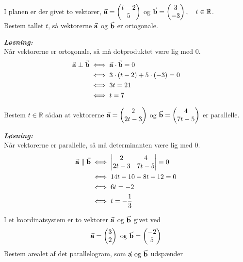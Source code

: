 \documentclass{article}
\newcommand{\sol}{\setlength{\parindent}{0cm}\textbf{\textit{Løsning:}}\setlength{\parindent}{1cm}}
\begin{document}
\begin{question}{}{}
  I planen er der givet to vektorer, $\va{a} =\begin{pmatrix} t-2\\ 5 \end{pmatrix}$ og $\va{b} =\begin{pmatrix} 3\\ -3 \end{pmatrix},\quad t \in \mathbb{R} $. \\
Bestem tallet $t$, så vektorerne $\va{a} $ og $\va{b} $ er ortogonale. 
\end{question}
\sol \\ 
Når vektorerne er ortogonale, så må dotproduktet være lig med 0.
\begin{equation*}
\begin{split}
  \va{a} \perp \va{b} &\iff \va{a} \cdot \va{b} =0\\ 
  &\iff 3 \cdot \left(t-2\right) + 5 \cdot \left(-3\right) =0\\ 
  &\iff 3t=21\\ 
  &\iff t=7
\end{split}
\end{equation*}
\begin{question}{}{}
  Bestem $t \in \mathbb{R}$ sådan at vektorerne $\va{a} = \begin{pmatrix} 2\\ 2t-3 \end{pmatrix} $ og $\va{b} =\begin{pmatrix} 4\\ 7t-5 \end{pmatrix} $ er parallelle. 
\end{question}
\sol \\ 
Når vektorerne er parallelle, så må determinanten være lig med 0.
\begin{equation*}
\begin{split}
  \va{a} \parallel \va{b} &\iff \mdet{2 & 4 \\ 2t-3 & 7t-5} = 0\\ 
  &\iff 14t-10-8t+12=0 \\ 
  &\iff 6t=-2\\ 
  &\iff t=-\frac{1}{3}
\end{split}
\end{equation*}
\begin{question}{}{}
 I et koordinatsystem er to vektorer $\va{a} $ og $\va{b} $ givet ved 
  \[
  \va{a} =\begin{pmatrix} 3\\ 2 \end{pmatrix} \text{ og } \va{b}=\mqty(-2\\ 5) 
  \] 
  Bestem arealet af det parallelogram, som $\va{a} \text{ og }\va{b} $ udspænder 
\end{question}
\end{document}
